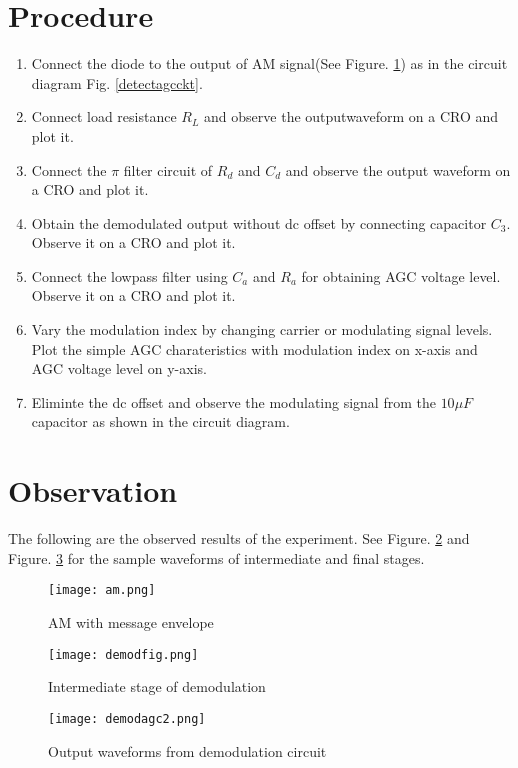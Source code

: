 \section*{Procedure}
\begin{enumerate}
\item
Connect the diode to the output of AM signal(See Figure. \ref{amenv}) as in the circuit diagram Fig. \ref{detectagcckt}.
\item
Connect load resistance $R_L$ and observe the outputwaveform on a CRO and plot it.
\item
Connect the $\pi$ filter circuit of $R_d$ and $C_d$ and observe the output waveform on a CRO and plot it.
\item
Obtain the demodulated output without dc offset by connecting capacitor $C_3$. Observe it on a CRO and plot it.
\item
Connect the lowpass filter using $C_a$ and $R_a$ for obtaining AGC voltage level. Observe it on a CRO and plot it.
\item Vary the modulation index by changing carrier or modulating signal levels. Plot the simple AGC charateristics with modulation index on x-axis and AGC voltage level on y-axis.
\item
Eliminte the dc offset and observe the modulating signal from the $10\mu F$ capacitor as shown in the circuit diagram.
\end{enumerate}
\section*{Observation}
The following are the observed results of the experiment. See Figure. \ref{aminter} and Figure. \ref{demodagcwaves} for the sample waveforms of intermediate and final stages.
\begin{figure}
\texttt{[image: am.png]}
\caption{AM with message envelope}
\label{amenv}
\end{figure}
\begin{figure}
\texttt{[image: demodfig.png]}
\caption{Intermediate stage of demodulation}
\label{aminter}

\end{figure}
\begin{figure}
\texttt{[image: demodagc2.png]}
\caption{Output waveforms from demodulation circuit}
\label{demodagcwaves}
\end{figure}

